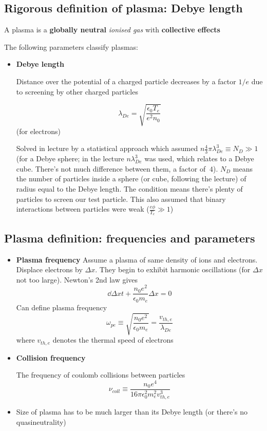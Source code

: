 	\subsection{Rigorous definition of plasma: Debye length}
	A plasma is a \textbf{globally neutral} \emph{ionised gas} with \textbf{collective effects}

	The following parameters classify plasmas:
		\begin{itemize}
			\item \textbf{Debye length}
			
			Distance over the potential of a charged particle decreases by a factor $1/e$ due to screening by other charged particles
			
			\[\lambda_{De} = \sqrt{\frac{\epsilon_0 T_e}{e^2 n_0}} \] (for electrons)
			
			Solved in lecture by a statistical approach which assumed $n\frac{4}{3}\pi \lambda_{De}^3 \equiv N_D \gg 1$ (for a Debye sphere; in the lecture $n \lambda_{De}^3$ was used, which relates to a Debye cube. There's not much difference between them, a factor of $~4$). $N_D$  means the number of particles inside a sphere (or cube, following the lecture) of radius equal to the Debye length. The condition means there's plenty of particles to screen our test particle. This also assumed that binary interactions between particles were weak ($\frac{e \phi}{T_e} \gg 1$)
			\end{itemize}
	\subsection{Plasma definition: frequencies and parameters}
\begin{itemize}
\item \textbf{Plasma frequency}
Assume a plasma of same density of ions and electrons. Displace electrons by $\Delta x$. They begin to exhibit harmonic oscillations (for $\Delta x$ not too large). Newton's 2nd law gives
\[\dd{\Delta x}{t} + \frac{n_0 e^2}{\epsilon_0 m_e}\Delta x = 0\]
Can define plasma frequency
\[\omega_{pe}\equiv\sqrt{\frac{n_0 e^2}{\epsilon_0 m_e}}=\frac{v_{th,e}}{\lambda_{De}}\]
where $v_{th,e}$ denotes the thermal speed of electrons
\item \textbf{Collision frequency}
	
	The frequency of coulomb collisions between particles
	\[\nu_{coll} \equiv \frac{n_0 e^4}{16 \pi \epsilon_0^2 m_e^2 v_{th,e}^3}\]
	
	\item Size of plasma has to be much larger than its Debye length (or there's no quasineutrality)
	\end{itemize}
	

